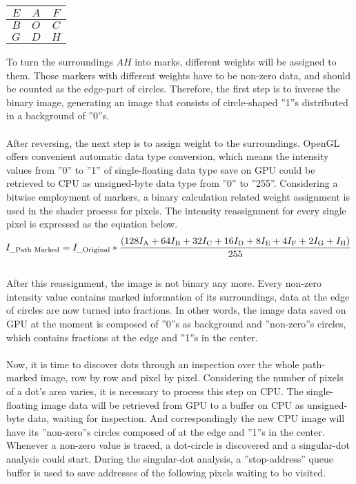 \begin{center}
  \begin{tabular}{ | c | c | c | }
    \hline
    \(E\) & \(A\) & \(F\) \\ \hline
    \(B\) & \(O\) & \(C\) \\ \hline
    \(G\) & \(D\) & \(H\) \\
    \hline
  \end{tabular}
\end{center}
%
To turn the surroundings \(A\)\texttildelow \(H\) into marks, different weights will be assigned to them. Those markers with different weights have to be non-zero data, and should be counted as the edge-part of circles. Therefore, the first step is to inverse the binary image, generating an image that consists of circle-shaped ''1''s distributed in a background of ''0''s.%
\\\\%
After reversing, the next step is to assign weight to the surroundings. OpenGL offers convenient automatic data type conversion, which means the intensity values from ''0'' to ''1'' of single-floating data type save on GPU could be retrieved to CPU as unsigned-byte data type from ''0'' to ''255''. Considering a bitwise employment of markers, a binary calculation related weight assignment is used in the shader process for pixels. The intensity reassignment for every single pixel is expressed as the equation below.
%
\begin{equation}
\hspace*{-0.1cm}%
%
I_{\text{\_Path Marked}} = I_{\text{\_Original}} * \frac{(128I_{\text{A}} + 64I_{\text{B}} + 32I_{\text{C}} + 16I_{\text{D}} + 8I_{\text{E}} +  4I_{\text{F}} +  2I_{\text{G}}+I_{\text{H}})}{ 255 }
%
\end{equation}%
\\%
After this reassignment, the image is not binary any more. Every non-zero intensity value contains marked information of its surroundings, data at the edge of circles are now turned into fractions. In other words, the image data saved on GPU at the moment is composed of ''0''s as background and ''non-zero''s circles, which contains fractions at the edge and ''1''s in the center.%
\\\\%
Now, it is time to discover dots through an inspection over the whole path-marked image, row by row and pixel by pixel. Considering the number of pixels of a dot's area varies, it is necessary to process this step on CPU. The single-floating image data will be retrieved from GPU to a buffer on CPU as unsigned-byte data, waiting for inspection. And correspondingly the new CPU image will have its ''non-zero''s circles composed of at the edge and ''1''s in the center. Whenever a non-zero value is traced, a dot-circle is discovered and a singular-dot analysis could start. During the singular-dot analysis, a ''stop-address'' queue buffer is used to save addresses of the following pixels waiting to be visited. %
